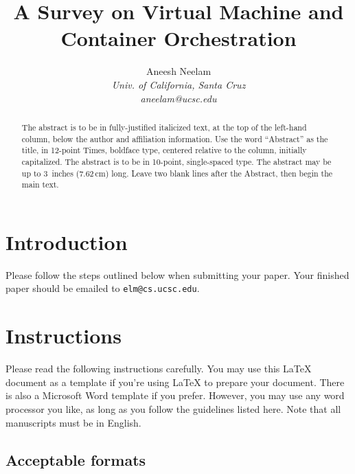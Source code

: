\documentclass[10pt,twocolumn]{article}
\newcommand{\latex}{\LaTeX\xspace}
\begin{document}
\title{A Survey on Virtual Machine and Container Orchestration}

\author{
Aneesh Neelam \\
\textit{Univ. of California, Santa Cruz} \\
\textit{aneelam@ucsc.edu}
}

\maketitle
\thispagestyle{empty}

\begin{abstract}
  The abstract is to be in fully-justified italicized text, at the top
  of the left-hand column, below the author and affiliation
  information. Use the word ``Abstract'' as the title, in 12-point
  Times, boldface type, centered relative to the column, initially
  capitalized. The abstract is to be in 10-point, single-spaced type.
  The abstract may be up to 3~inches (7.62\,cm) long. Leave two blank
  lines after the Abstract, then begin the main text.
\end{abstract}

\section{Introduction}

Please follow the steps outlined below when submitting your paper.  Your
finished paper should be emailed to \verb+elm@cs.ucsc.edu+.

\section{Instructions}

Please read the following instructions carefully.  You may use this
\latex document as a template if you're using \latex to prepare your
document.  There is also a Microsoft Word template if you prefer.
However, you may use any word processor you like, as long as you
follow the guidelines listed here.  Note that all manuscripts must be
in English.

\subsection{Acceptable formats}
\end{document}
